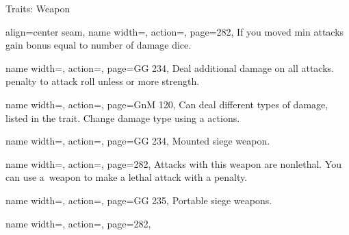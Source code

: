\begin{PageBack}
\begin{Tables}{\backTableHeight}
\begin{Table}{Traits: Weapon}
\begin{entry}{}{%
                align=center seam,
                name width=\conditionLength,%
                action=\Jousting,
                page=282,
            }
                If you moved min  \Feet attacks gain \Cirm bonus equal to number of damage dice.
            \end{entry}
            \breakLine
            \begin{entry}{}{%
                name width=\conditionLength,%
                action=\Kickback,
                page=GG 234,
            }
                Deal  additional damage on all attacks.
                 \Cirm penalty to attack roll unless  or more strength. \hfill
            \end{entry}
            \begin{entry}{}{%
                name width=\conditionLength,%
                action=\Modular,
                page=GnM 120,
            }
                Can deal different types of damage, listed in the trait.
                Change damage type using a  actions.
            \end{entry}
            \begin{entry}{}{%
                name width=\conditionLength,%
                action=\Mounted,
                page=GG 234,
            }
                Mounted siege weapon.
            \end{entry}
            \breakLine
            \begin{entry}{}{%
                name width=\conditionLength,%
                action=\Nonlethal,
                page=282,
            }
                Attacks with this weapon are nonlethal.
                You can use a \Nonlethal\,weapon to make a lethal attack with a  \Cirm penalty.
            \end{entry}
            \breakLine
            \begin{entry}{}{%
                name width=\conditionLength,%
                action=\Portable,
                page=GG 235,
            }
                Portable siege weapons.
            \end{entry}
            \begin{entry}{}{%
                name width=\conditionLength,%
                action=\Propulsive,
                page=282,
            }

\end{entry}
\end{Table}
\end{Tables}
\end{PageBack}
